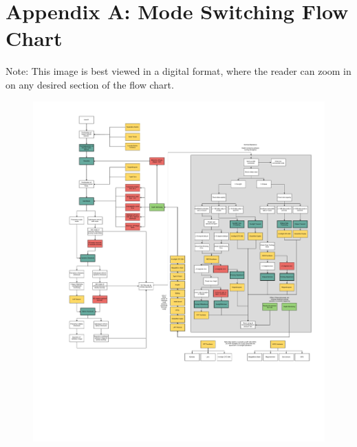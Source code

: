 \documentclass{article}
\begin{document}
\newpage

\section{Appendix A: Mode Switching Flow Chart}

Note: This image is best viewed in a digital format, where the reader can zoom in on any desired section of the flow chart.

\begin{figure}[h!]
\centering
\includegraphics[width=\textwidth,height=.8\textheight]{FlowChart.pdf}
\end{figure} 
\end{document}
